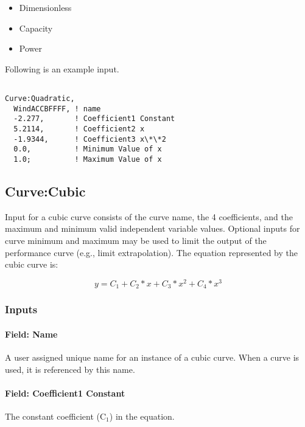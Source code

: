 \begin{itemize}
\item
  Dimensionless
\item
  Capacity
\item
  Power
\end{itemize}

Following is an example input.

\begin{lstlisting}

Curve:Quadratic,
  WindACCBFFFF, ! name
  -2.277,       ! Coefficient1 Constant
  5.2114,       ! Coefficient2 x
  -1.9344,      ! Coefficient3 x\*\*2
  0.0,          ! Minimum Value of x
  1.0;          ! Maximum Value of x
\end{lstlisting}

\subsection{Curve:Cubic}\label{curvecubic}

Input for a cubic curve consists of the curve name, the 4 coefficients, and the maximum and minimum valid independent variable values. Optional inputs for curve minimum and maximum may be used to limit the output of the performance curve (e.g., limit extrapolation). The equation represented by the cubic curve is:

\begin{equation}
y = {C_1} + {C_2}*x + {C_3}*{x^2} + {C_4}*{x^3}
\end{equation}

\subsubsection{Inputs}\label{inputs-3-024}

\paragraph{Field: Name}\label{field-name-3-021}

A user assigned unique name for an instance of a cubic curve. When a curve is used, it is referenced by this name.

\paragraph{Field: Coefficient1 Constant}\label{field-coefficient1-constant-3}

The constant coefficient (C\(_{1}\)) in the equation.

